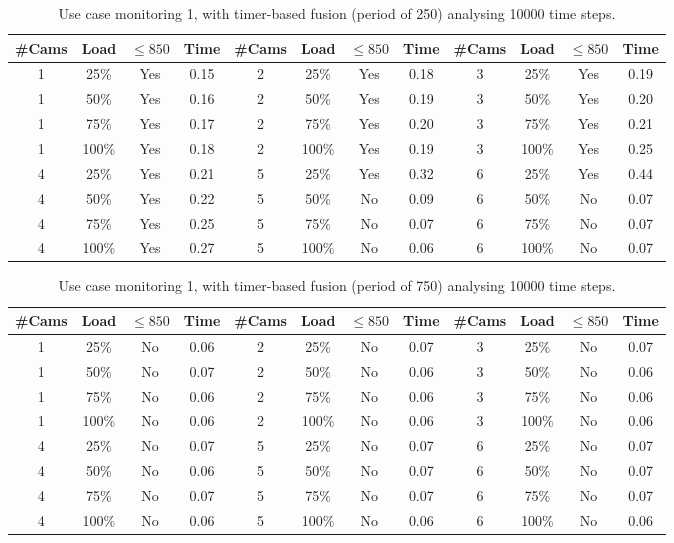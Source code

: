 \documentclass{article}
\begin{document}
\begin{table}
\centering
\begin{tabular}{|c|c|c|c|c|c|c|c|c|c|c|c|}
\hline
\#Cams & Load & $\leq 850$ & Time & \#Cams & Load & $\leq 850$ & Time & \#Cams & Load & $\leq 850$ & Time\\
\hline
1 & 25\% & Yes & 0.15 & 2 & 25\% & Yes & 0.18 & 3 & 25\% & Yes & 0.19\\
1 & 50\% & Yes & 0.16 & 2 & 50\% & Yes & 0.19 & 3 & 50\% & Yes & 0.20\\
1 & 75\% & Yes & 0.17 & 2 & 75\% & Yes & 0.20 & 3 & 75\% & Yes & 0.21\\
1 & 100\% & Yes & 0.18 & 2 & 100\% & Yes & 0.19 & 3 & 100\% & Yes & 0.25\\
\hline
4 & 25\% & Yes & 0.21 & 5 & 25\% & Yes & 0.32 & 6 & 25\% & Yes & 0.44\\
4 & 50\% & Yes & 0.22 & 5 & 50\% & No & 0.09 & 6 & 50\% & No & 0.07\\
4 & 75\% & Yes & 0.25 & 5 & 75\% & No & 0.07 & 6 & 75\% & No & 0.07\\
4 & 100\% & Yes & 0.27 & 5 & 100\% & No & 0.06 & 6 & 100\% & No & 0.07\\
\hline
\end{tabular}
\caption{Use case monitoring 1, with timer-based fusion (period of 250) analysing 10000 time steps.}
\end{table}


\begin{table}
\centering
\begin{tabular}{|c|c|c|c|c|c|c|c|c|c|c|c|}
\hline
\#Cams & Load & $\leq 850$ & Time & \#Cams & Load & $\leq 850$ & Time & \#Cams & Load & $\leq 850$ & Time\\
\hline
1 & 25\% & No & 0.06 & 2 & 25\% & No & 0.07 & 3 & 25\% & No & 0.07\\
1 & 50\% & No & 0.07 & 2 & 50\% & No & 0.06 & 3 & 50\% & No & 0.06\\
1 & 75\% & No & 0.06 & 2 & 75\% & No & 0.06 & 3 & 75\% & No & 0.06\\
1 & 100\% & No & 0.06 & 2 & 100\% & No & 0.06 & 3 & 100\% & No & 0.06\\
\hline
4 & 25\% & No & 0.07 & 5 & 25\% & No & 0.07 & 6 & 25\% & No & 0.07\\
4 & 50\% & No & 0.06 & 5 & 50\% & No & 0.07 & 6 & 50\% & No & 0.07\\
4 & 75\% & No & 0.07 & 5 & 75\% & No & 0.07 & 6 & 75\% & No & 0.07\\
4 & 100\% & No & 0.06 & 5 & 100\% & No & 0.06 & 6 & 100\% & No & 0.06\\
\hline
\end{tabular}
\caption{Use case monitoring 1, with timer-based fusion (period of 750) analysing 10000 time steps.}
\end{table}
\end{document}

